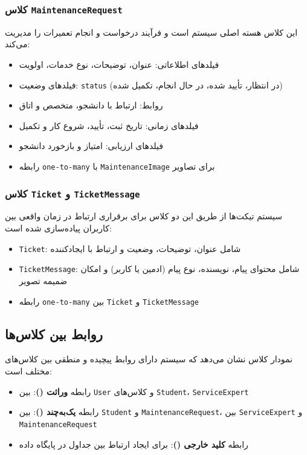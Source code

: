 \documentclass[12pt,a4paper]{report}
\begin{document}
	\subsubsection*{کلاس \texttt{MaintenanceRequest}}
	
	این کلاس هسته اصلی سیستم است و فرآیند درخواست و انجام تعمیرات را مدیریت می‌کند:
	
	\begin{itemize}
		\item فیلدهای اطلاعاتی: عنوان، توضیحات، نوع خدمات، اولویت
		\item فیلدهای وضعیت: \texttt{status} (در انتظار، تأیید شده، در حال انجام، تکمیل شده)
		\item روابط: ارتباط با دانشجو، متخصص و اتاق
		\item فیلدهای زمانی: تاریخ ثبت، تأیید، شروع کار و تکمیل
		\item فیلدهای ارزیابی: امتیاز و بازخورد دانشجو
		\item رابطه \texttt{one-to-many} با \texttt{MaintenanceImage} برای تصاویر
	\end{itemize}
	
	\subsubsection*{کلاس \texttt{Ticket} و \texttt{TicketMessage}}
	
	سیستم تیکت‌ها از طریق این دو کلاس برای برقراری ارتباط در زمان واقعی بین کاربران پیاده‌سازی شده است:
	
	\begin{itemize}
		\item \texttt{Ticket}: شامل عنوان، توضیحات، وضعیت و ارتباط با ایجادکننده
		\item \texttt{TicketMessage}: شامل محتوای پیام، نویسنده، نوع پیام (ادمین یا کاربر) و امکان ضمیمه تصویر
		\item رابطه \texttt{one-to-many} بین \texttt{Ticket} و \texttt{TicketMessage}
	\end{itemize}
	
	\subsection{روابط بین کلاس‌ها}
	
	نمودار کلاس نشان می‌دهد که سیستم دارای روابط پیچیده و منطقی بین کلاس‌های مختلف است:
	
	\begin{itemize}
		\item رابطه \textbf{وراثت ()}: بین \texttt{User} و کلاس‌های \texttt{Student}، \texttt{ServiceExpert}
		\item رابطه \textbf{یک‌به‌چند ()}: بین \texttt{Student} و \texttt{MaintenanceRequest}، بین \texttt{ServiceExpert} و \texttt{MaintenanceRequest}
		\item رابطه \textbf{کلید خارجی ()}: برای ایجاد ارتباط بین جداول در پایگاه داده
	\end{itemize}
	
\end{document}
